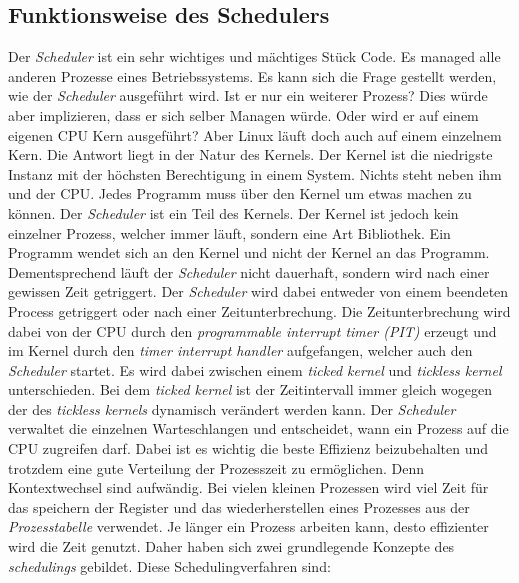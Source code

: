 \newpage

\subsection{Funktionsweise des Schedulers}
Der \textit{Scheduler} ist ein sehr wichtiges und mächtiges Stück Code. Es managed alle anderen Prozesse eines Betriebssystems. Es kann sich die Frage gestellt werden, wie der \textit{Scheduler} ausgeführt wird. Ist er nur ein weiterer Prozess? Dies würde aber implizieren, dass er sich selber Managen würde. Oder wird er auf einem eigenen CPU Kern ausgeführt? Aber Linux läuft doch auch auf einem einzelnem Kern. Die Antwort liegt in der Natur des Kernels.
\medskip
\newline
Der Kernel ist die niedrigste Instanz mit der höchsten Berechtigung in einem System. Nichts steht neben ihm und der CPU. Jedes Programm muss über den Kernel um etwas machen zu können. Der \textit{Scheduler} ist ein Teil des Kernels. Der Kernel ist jedoch kein einzelner Prozess, welcher immer läuft, sondern eine Art Bibliothek. Ein Programm wendet sich an den Kernel und nicht der Kernel an das Programm. Dementsprechend läuft der \textit{Scheduler} nicht dauerhaft, sondern wird nach einer gewissen Zeit getriggert. Der \textit{Scheduler} wird dabei entweder von einem beendeten Process getriggert oder nach einer Zeitunterbrechung. Die Zeitunterbrechung wird dabei von der CPU durch den \textit{programmable interrupt timer (PIT)} erzeugt und im Kernel durch den \textit{timer interrupt handler} aufgefangen, welcher auch den \textit{Scheduler} startet. Es wird dabei zwischen einem \textit{ticked kernel} und \textit{tickless kernel} unterschieden. Bei dem \textit{ticked kernel} ist der Zeitintervall immer gleich wogegen der des \textit{tickless kernels} dynamisch verändert werden kann.\cite{tickles:Love}
\bigskip
\newline
Der \textit{Scheduler} verwaltet die einzelnen Warteschlangen und entscheidet, wann ein Prozess auf die CPU zugreifen darf. Dabei ist es wichtig die beste Effizienz beizubehalten und trotzdem eine gute Verteilung der Prozesszeit zu ermöglichen. Denn Kontextwechsel sind aufwändig. Bei vielen kleinen Prozessen wird viel Zeit für das speichern der Register und das wiederherstellen eines Prozesses aus der \textit{Prozesstabelle} verwendet. Je länger ein Prozess arbeiten kann, desto effizienter wird die Zeit genutzt. Daher haben sich zwei grundlegende Konzepte des \textit{schedulings} gebildet. Diese Schedulingverfahren sind:
